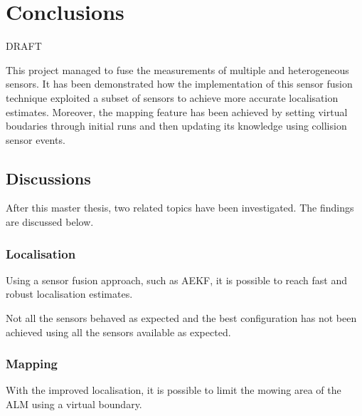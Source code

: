 \chapter{Conclusions}
\label{ch:conclusion}

DRAFT

\noindent
This project managed to fuse the measurements of multiple and heterogeneous sensors.
It has been demonstrated how the implementation of this sensor fusion technique exploited a subset of sensors to achieve more accurate localisation estimates.
Moreover, the mapping feature has been achieved by setting virtual boudaries through initial runs and then updating its knowledge using collision sensor events.

\section{Discussions}
\label{sec:discussion}


\noindent After this master thesis, two related topics have been investigated.
The findings are discussed below.


\subsection{Localisation}
\noindent
Using a sensor fusion approach, such as \gls{AEKF}, it is possible to reach fast and robust localisation estimates.

Not all the sensors behaved as expected and the best configuration has not been achieved using all the sensors available as expected.

\subsection{Mapping}
\noindent
With the improved localisation, it is possible to limit the mowing area of the \gls{ALM} using a virtual boundary.

